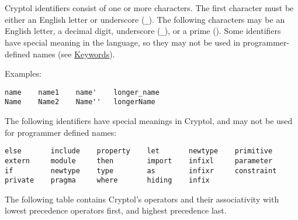 Cryptol identifiers consist of one or more characters. The first
character must be either an English letter or underscore (\texttt{\_}).
The following characters may be an English letter, a decimal digit,
underscore (\texttt{\_}), or a prime (\texttt{\textquotesingle{}}). Some
identifiers have special meaning in the language, so they may not be
used in programmer-defined names (see
\hyperref[keywords-and-built-in-operators]{Keywords}).

Examples:

\begin{verbatim}
name    name1    name'    longer_name
Name    Name2    Name''   longerName
\end{verbatim}


The following identifiers have special meanings in Cryptol, and may not
be used for programmer defined names:


\begin{verbatim}
else       include    property    let       newtype    primitive
extern     module     then        import    infixl     parameter
if         newtype    type        as        infixr     constraint
private    pragma     where       hiding    infix
\end{verbatim}

The following table contains Cryptol's operators and their associativity
with lowest precedence operators first, and highest precedence last.

